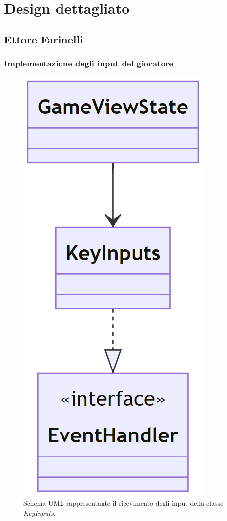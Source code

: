 \documentclass[a4paper,12pt]{report}
\begin{document}

\section{Design dettagliato}

\subsection*{Ettore Farinelli}
\subsubsection{Implementazione degli input del giocatore}
\begin{figure}[H]
\centering{}
\includegraphics[scale = 0.5]{img/KeyInputsUML.PNG}
\caption{Schema UML rappresentante il ricevimento degli input della classe \emph{KeyInputs}.}
\end{figure}
\end{document}
